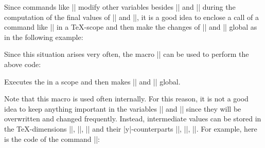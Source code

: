 Since commands like |\pgfpointnormalised| modify other variables besides
|\pgf@x| and |\pgf@y| during the computation of the final values of |\pgf@x|
and |\pgf@y|, it is a good idea to enclose a call of a command like |\pgfpoint|
in a \TeX-scope and then make the changes of |\pgf@x| and |\pgf@y| global as in
the following example:

\makeatletter
Since this situation arises very often, the macro |\pgf@process| can
be used to perform the above code:
\begin{command}{\pgf@process{}}
    Executes the  in a scope and then makes |\pgf@x| and |\pgf@y|
    global.
\end{command}

Note that this macro is used often internally. For this reason, it is not a
good idea to keep anything important in the variables |\pgf@x| and |\pgf@y|
since they will be overwritten and changed frequently. Instead, intermediate
values can be stored in the \TeX-dimensions |\pgf@xa|, |\pgf@xb|, |\pgf@xc| and
their |y|-counterparts |\pgf@ya|, |\pgf@yb|, |\pgf@yc|. For example, here is the
code of the command |\pgfpointadd|:
%
\begin{codeexample}
\def\pgfpointadd#1#2{%
  \pgf@process{#1}%
  \pgf@xa=\pgf@x%
  \pgf@ya=\pgf@y%
  \pgf@process{#2}%
  \advance\pgf@x by\pgf@xa%
  \advance\pgf@y by\pgf@ya}
\end{codeexample}


